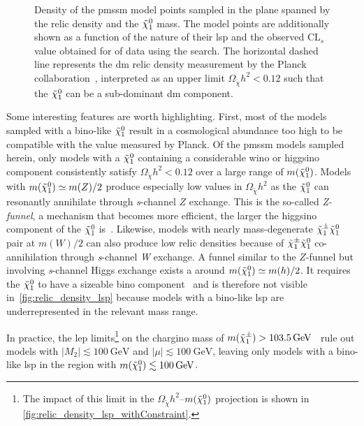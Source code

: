 \begin{figure}
\begin{subfigure}[b]{0.545\linewidth}
		\caption{\label{fig:relic_density_lsp_cls}}
	\end{subfigure}\hfill
	\caption{Density of the \gls{pmssm} model points sampled in the plane spanned by the relic density and the $\tilde{\chi}_1^0$ mass. The model points are additionally shown as a function of  the nature of their \gls{lsp} and  the observed CL$_s$ value obtained for \onethirtynineifb of data using the \onelepton search. The horizontal dashed line represents the \gls{dm} relic density measurement by the Planck collaboration~\cite{Planck}, interpreted as an upper limit $\Omega_{\tilde{\chi}} h^2 < 0.12$ such that the $\tilde{\chi}_1^0$ can be a sub-dominant \gls{dm} component.}
	\label{fig:relic_density}
\end{figure}


Some interesting features are worth highlighting. First, most of the models sampled with a bino-like $\tilde{\chi}_1^0$ result in a cosmological abundance too high to be compatible with the value measured by Planck.
Of the \gls{pmssm} models sampled herein, only models with a $\tilde{\chi}_1^0$ containing a considerable wino or higgsino component consistently satisfy $\Omega_{\tilde{\chi}} h^2 < 0.12$ over a large range of $m(\tilde{\chi}_1^0)$.
Models with $m(\tilde{\chi}_1^0) \simeq m(Z)/2$ produce especially low values in $\Omega_{\tilde{\chi}} h^2$ as the $\tilde{\chi}_1^0$ can resonantly annihilate through \textit{s}-channel $Z$ exchange. This is the so-called \textit{Z-funnel}, a mechanism that becomes more efficient, the larger the higgsino component of the $\tilde{\chi}_1^0$ is~\cite{Cabrera:2016wwr}.
Likewise, models with nearly mass-degenerate $\tilde{\chi}_1^\pm\tilde{\chi}_1^0$ pair at $m(W)/2$ can also produce low relic densities because of $\tilde{\chi}_1^\pm\tilde{\chi}_1^0$ co-annihilation through \textit{s}-channel \textit{W} exchange.
A funnel similar to the $Z$-funnel but involving \textit{s}-channel Higgs exchange exists a around $m(\tilde{\chi}_1^0) \simeq m(h)/2$. It requires the $\tilde{\chi}_1^0$ to have a sizeable bino component~\cite{Cabrera:2016wwr} and is therefore not visible in~\cref{fig:relic_density_lsp} because models with a bino-like \gls{lsp} are underrepresented in the relevant mass range.

In practice, the \gls{lep} limits\footnote{The impact of this limit in the $\Omega_{\tilde{\chi}} h^2$--$m(\tilde{\chi}_1^0)$ projection is shown in \cref{fig:relic_density_lsp_withConstraint}.} on the chargino mass of $m(\charg) > \SI{103.5}{\GeV}$~\cite{lep_susy_results} rule out models with $\vert M_2 \vert \lesssim \SI{100}{\GeV}$ and $\vert \mu \vert \lesssim \SI{100}{\GeV}$, leaving only models with a bino-like \gls{lsp} in the region with $m(\lsp)\lesssim \SI{100}{\GeV}$.

